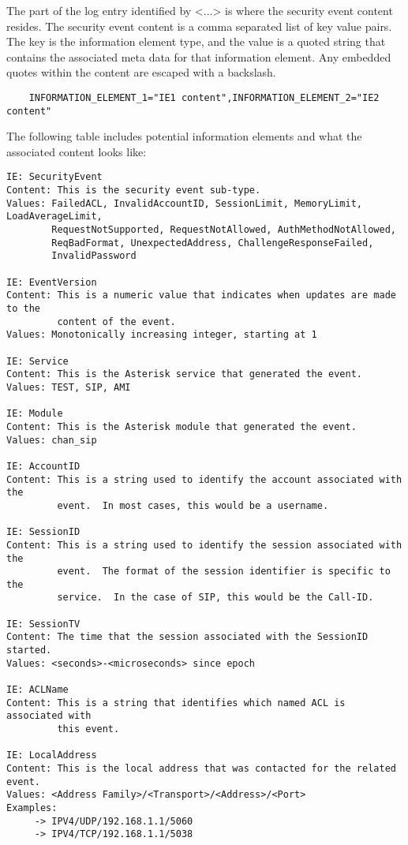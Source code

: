     The part of the log entry identified by <...> is where the security event
content resides.  The security event content is a comma separated list
of key value pairs.  The key is the information element type, and the value is a
quoted string that contains the associated meta data for that information
element.  Any embedded quotes within the content are escaped with a
backslash.

\begin{verbatim}
    INFORMATION_ELEMENT_1="IE1 content",INFORMATION_ELEMENT_2="IE2 content"
\end{verbatim}

The following table includes potential information elements and what the
associated content looks like:

\begin{verbatim}
IE: SecurityEvent
Content: This is the security event sub-type.
Values: FailedACL, InvalidAccountID, SessionLimit, MemoryLimit, LoadAverageLimit,
        RequestNotSupported, RequestNotAllowed, AuthMethodNotAllowed,
        ReqBadFormat, UnexpectedAddress, ChallengeResponseFailed,
        InvalidPassword

IE: EventVersion
Content: This is a numeric value that indicates when updates are made to the
         content of the event.
Values: Monotonically increasing integer, starting at 1

IE: Service
Content: This is the Asterisk service that generated the event.
Values: TEST, SIP, AMI

IE: Module
Content: This is the Asterisk module that generated the event.
Values: chan_sip

IE: AccountID
Content: This is a string used to identify the account associated with the
         event.  In most cases, this would be a username.

IE: SessionID
Content: This is a string used to identify the session associated with the
         event.  The format of the session identifier is specific to the
         service.  In the case of SIP, this would be the Call-ID.

IE: SessionTV
Content: The time that the session associated with the SessionID started.
Values: <seconds>-<microseconds> since epoch

IE: ACLName
Content: This is a string that identifies which named ACL is associated with
         this event.

IE: LocalAddress
Content: This is the local address that was contacted for the related event.
Values: <Address Family>/<Transport>/<Address>/<Port>
Examples:
     -> IPV4/UDP/192.168.1.1/5060
     -> IPV4/TCP/192.168.1.1/5038


\end{verbatim}
